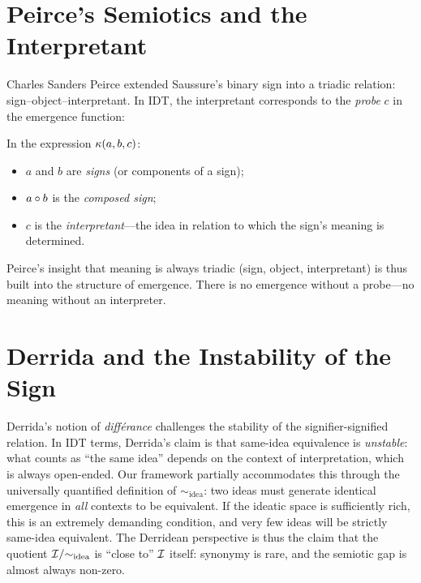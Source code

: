 \section{Peirce's Semiotics and the Interpretant}

Charles Sanders Peirce extended Saussure's binary sign into a triadic
relation: sign--object--interpretant. In IDT, the interpretant corresponds
to the \emph{probe} $c$ in the emergence function:

\begin{interpretation}
In the expression $\kappa(a, b, c)$:
\begin{itemize}
    \item $a$ and $b$ are \emph{signs} (or components of a sign);
    \item $a \circ b$ is the \emph{composed sign};
    \item $c$ is the \emph{interpretant}---the idea in relation to which
          the sign's meaning is determined.
\end{itemize}
Peirce's insight that meaning is always triadic (sign, object,
interpretant) is thus built into the structure of emergence. There is no
emergence without a probe---no meaning without an interpreter.
\end{interpretation}

\section{Derrida and the Instability of the Sign}

\begin{remark}
Derrida's notion of \emph{diff\'erance} challenges the stability of the
signifier-signified relation. In IDT terms, Derrida's claim is that
same-idea equivalence is \emph{unstable}: what counts as ``the same idea''
depends on the context of interpretation, which is always open-ended.
Our framework partially accommodates this through the universally
quantified definition of $\sim_{\mathrm{idea}}$: two ideas must generate
identical emergence in \emph{all} contexts to be equivalent. If
the ideatic space is sufficiently rich, this is an extremely demanding
condition, and very few ideas will be strictly same-idea equivalent.
The Derridean perspective is thus the claim that the quotient
$\mathcal{I} / {\sim_{\mathrm{idea}}}$ is ``close to'' $\mathcal{I}$ itself:
synonymy is rare, and the semiotic gap is almost always non-zero.
\end{remark}

